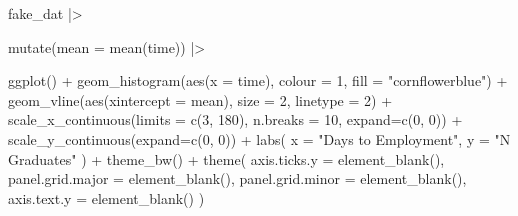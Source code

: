 \documentclass[
  letterpaper,
  DIV=11,
  numbers=noendperiod]{scrreprt}
\newenvironment{Shaded}{\begin{snugshade}}{\end{snugshade}}
\newcommand{\AttributeTok}[1]{\textcolor[rgb]{0.40,0.45,0.13}{#1}}
\newcommand{\DecValTok}[1]{\textcolor[rgb]{0.68,0.00,0.00}{#1}}
\newcommand{\FunctionTok}[1]{\textcolor[rgb]{0.28,0.35,0.67}{#1}}
\newcommand{\NormalTok}[1]{\textcolor[rgb]{0.00,0.23,0.31}{#1}}
\newcommand{\SpecialCharTok}[1]{\textcolor[rgb]{0.37,0.37,0.37}{#1}}
\newcommand{\StringTok}[1]{\textcolor[rgb]{0.13,0.47,0.30}{#1}}
\begin{document}
\begin{Shaded}
\begin{Highlighting}[]
\NormalTok{fake\_dat }\SpecialCharTok{|\textgreater{}}

  \FunctionTok{mutate}\NormalTok{(}\AttributeTok{mean =} \FunctionTok{mean}\NormalTok{(time)) }\SpecialCharTok{|\textgreater{}}

  \FunctionTok{ggplot}\NormalTok{() }\SpecialCharTok{+} 
  \FunctionTok{geom\_histogram}\NormalTok{(}\FunctionTok{aes}\NormalTok{(}\AttributeTok{x =}\NormalTok{ time), }\AttributeTok{colour =} \DecValTok{1}\NormalTok{, }\AttributeTok{fill =} \StringTok{"cornflowerblue"}\NormalTok{) }\SpecialCharTok{+}
  \FunctionTok{geom\_vline}\NormalTok{(}\FunctionTok{aes}\NormalTok{(}\AttributeTok{xintercept =}\NormalTok{ mean), }\AttributeTok{size =} \DecValTok{2}\NormalTok{, }\AttributeTok{linetype =} \DecValTok{2}\NormalTok{) }\SpecialCharTok{+}
  \FunctionTok{scale\_x\_continuous}\NormalTok{(}\AttributeTok{limits =} \FunctionTok{c}\NormalTok{(}\DecValTok{3}\NormalTok{, }\DecValTok{180}\NormalTok{), }\AttributeTok{n.breaks =} \DecValTok{10}\NormalTok{, }\AttributeTok{expand=}\FunctionTok{c}\NormalTok{(}\DecValTok{0}\NormalTok{, }\DecValTok{0}\NormalTok{)) }\SpecialCharTok{+}
  \FunctionTok{scale\_y\_continuous}\NormalTok{(}\AttributeTok{expand=}\FunctionTok{c}\NormalTok{(}\DecValTok{0}\NormalTok{, }\DecValTok{0}\NormalTok{)) }\SpecialCharTok{+}
  \FunctionTok{labs}\NormalTok{(}
    \AttributeTok{x =} \StringTok{"Days to Employment"}\NormalTok{,}
    \AttributeTok{y =} \StringTok{"N Graduates"}
\NormalTok{  ) }\SpecialCharTok{+}
  \FunctionTok{theme\_bw}\NormalTok{() }\SpecialCharTok{+}
  \FunctionTok{theme}\NormalTok{(}
    \AttributeTok{axis.ticks.y =} \FunctionTok{element\_blank}\NormalTok{(),}
    \AttributeTok{panel.grid.major =} \FunctionTok{element\_blank}\NormalTok{(),}
    \AttributeTok{panel.grid.minor =} \FunctionTok{element\_blank}\NormalTok{(),}
    \AttributeTok{axis.text.y =} \FunctionTok{element\_blank}\NormalTok{()}
\NormalTok{  )}
\end{Highlighting}
\end{Shaded}
\end{document}
